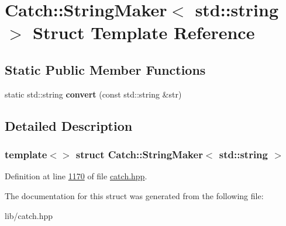 \hypertarget{structCatch_1_1StringMaker_3_01std_1_1string_01_4}{}\section{Catch\+::String\+Maker$<$ std\+::string $>$ Struct Template Reference}
\label{structCatch_1_1StringMaker_3_01std_1_1string_01_4}
\subsection*{Static Public Member Functions}
\begin{DoxyCompactItemize}
\item 
\mbox{\label{structCatch_1_1StringMaker_3_01std_1_1string_01_4_ae065b2ecc5c1a6c4409cf06d604bd66d}} 
static std\+::string {\bfseries convert} (const std\+::string \&str)
\end{DoxyCompactItemize}


\subsection{Detailed Description}
\subsubsection*{template$<$$>$\newline
struct Catch\+::\+String\+Maker$<$ std\+::string $>$}



Definition at line \mbox{\hyperlink{catch_8hpp_source_l01170}{1170}} of file \mbox{\hyperlink{catch_8hpp_source}{catch.\+hpp}}.



The documentation for this struct was generated from the following file\+:\begin{DoxyCompactItemize}
\item 
lib/catch.\+hpp\end{DoxyCompactItemize}
